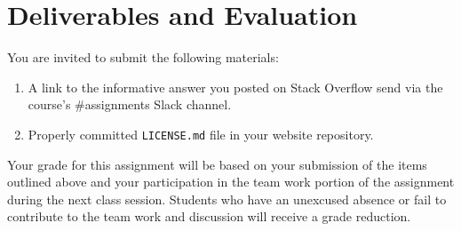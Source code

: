 \documentclass[11pt]{article}
\begin{document}
\section*{Deliverables and Evaluation}

You are invited to submit the following materials:
\begin{enumerate}
	\item A link to the informative answer you posted on Stack Overflow send via the course's \#assignments Slack channel. 
	\item Properly committed {\tt LICENSE.md} file in your website repository.
\end{enumerate}

Your grade for this assignment will be based on your submission of the items outlined above and your participation in the team work portion of the assignment during the next class session. Students who have an unexcused absence or fail to contribute to the team work and discussion will receive a grade reduction.
\end{document}
